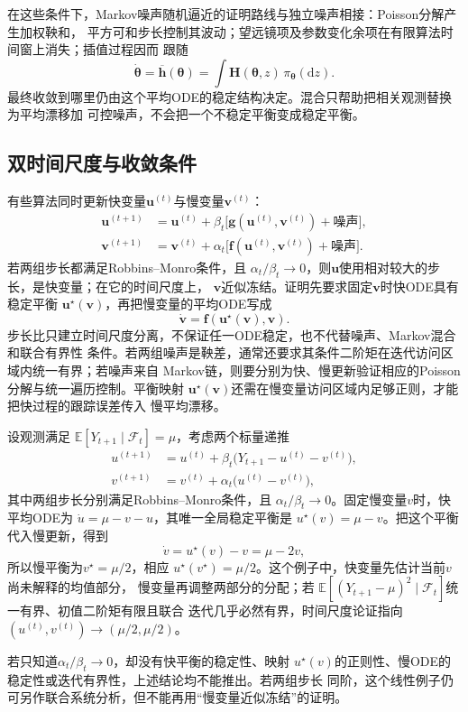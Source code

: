 在这些条件下，Markov噪声随机逼近的证明路线与独立噪声相接：Poisson分解产生加权鞅和，
平方可和步长控制其波动；望远镜项及参数变化余项在有限算法时间窗上消失；插值过程因而
跟随
\[
  \dot{\bm{\theta}}
  =\overline{\bm{h}}(\bm{\theta})
  =\int\bm{H}(\bm{\theta},z)\,\pi_{\bm{\theta}}(\mathrm{d}z).
\]
最终收敛到哪里仍由这个平均ODE的稳定结构决定。混合只帮助把相关观测替换为平均漂移加
可控噪声，不会把一个不稳定平衡变成稳定平衡。

\subsection{双时间尺度与收敛条件}

有些算法同时更新快变量$\bm{u}^{(t)}$与慢变量$\bm{v}^{(t)}$：
\begin{align*}
  \bm{u}^{(t+1)}
  &=\bm{u}^{(t)}+\beta_t\bigl[
    \bm{g}(\bm{u}^{(t)},\bm{v}^{(t)})
    +\text{噪声}
  \bigr],\\
  \bm{v}^{(t+1)}
  &=\bm{v}^{(t)}+\alpha_t\bigl[
    \bm{f}(\bm{u}^{(t)},\bm{v}^{(t)})
    +\text{噪声}
  \bigr].
\end{align*}
若两组步长都满足Robbins--Monro条件，且
$\alpha_t/\beta_t\to0$，则$\bm{u}$使用相对较大的步长，是快变量；在它的时间尺度上，
$\bm{v}$近似冻结。证明先要求固定$\bm{v}$时快ODE具有稳定平衡
$\bm{u}^{\star}(\bm{v})$，再把慢变量的平均ODE写成
\[
  \dot{\bm{v}}
  =
  \bm{f}(\bm{u}^{\star}(\bm{v}),\bm{v}).
\]
步长比只建立时间尺度分离，不保证任一ODE稳定，也不代替噪声、Markov混合和联合有界性
条件。若两组噪声是鞅差，通常还要求其条件二阶矩在迭代访问区域内统一有界；若噪声来自
Markov链，则要分别为快、慢更新验证相应的Poisson分解与统一遍历控制。平衡映射
$\bm{u}^{\star}(\bm{v})$还需在慢变量访问区域内足够正则，才能把快过程的跟踪误差传入
慢平均漂移。

\begin{example}[分解同一个未知均值的快慢更新]
  \label{ex:stoch-two-timescale-mean-splitting}
  设观测满足
  $\mathbb{E}[Y_{t+1}\mid\mathcal{F}_t]=\mu$，考虑两个标量递推
  \begin{align*}
    u^{(t+1)}
    &=
    u^{(t)}
    +\beta_t\bigl(Y_{t+1}-u^{(t)}-v^{(t)}\bigr),\\
    v^{(t+1)}
    &=
    v^{(t)}
    +\alpha_t\bigl(u^{(t)}-v^{(t)}\bigr),
  \end{align*}
  其中两组步长分别满足Robbins--Monro条件，且
  $\alpha_t/\beta_t\to0$。固定慢变量$v$时，快平均ODE为
  $\dot u=\mu-v-u$，其唯一全局稳定平衡是
  $u^\star(v)=\mu-v$。把这个平衡代入慢更新，得到
  \[
    \dot v=u^\star(v)-v=\mu-2v,
  \]
  所以慢平衡为$v^\star=\mu/2$，相应
  $u^\star(v^\star)=\mu/2$。这个例子中，快变量先估计当前$v$尚未解释的均值部分，
  慢变量再调整两部分的分配；若
  $\mathbb{E}[(Y_{t+1}-\mu)^2\mid\mathcal{F}_t]$统一有界、初值二阶矩有限且联合
  迭代几乎必然有界，时间尺度论证指向
  $(u^{(t)},v^{(t)})\to(\mu/2,\mu/2)$。

  若只知道$\alpha_t/\beta_t\to0$，却没有快平衡的稳定性、映射
  $u^\star(v)$的正则性、慢ODE的稳定性或迭代有界性，上述结论均不能推出。若两组步长
  同阶，这个线性例子仍可另作联合系统分析，但不能再用“慢变量近似冻结”的证明。
\end{example}

